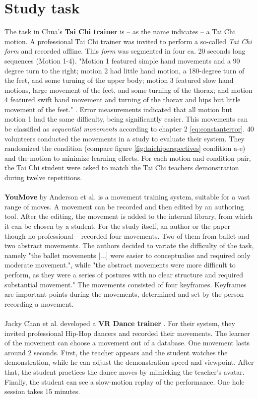 \section{Study task}
The task in Chua's \cite{Chua2003} \textbf{Tai Chi trainer} is \--- as the name indicates \--- a Tai Chi motion. A professional Tai Chi trainer was invited to perform a so-called \textit{Tai Chi form} and recorded offline. This \textit{form} was segmented in four ca. 20 seconds long sequences (Motion 1-4). "Motion 1 featured simple hand movements and a 90 degree turn to the right; motion 2 had little hand motion, a 180-degree turn of the feet, and some turning of the upper body; motion 3 featured slow hand motions, large movement of the feet, and some turning of the thorax; and motion 4 featured swift hand movement and turning of the thorax and hips but little movement of the feet." \cite{Chua2003}. Error measurements indicated that all motion but motion 1 had the same difficulty, being significantly easier. This movements can be classified as \textit{sequential movements} according to chapter 2 \ref{eq:constanterror}. 40 volunteers conducted the movements in a study to evaluate their system. They randomized the condition (compare figure \ref{fig:taichiperspectives} condition a-e) and the motion to minimize learning effects. For each motion and condition pair, the Tai Chi student were asked to match the Tai Chi teachers demonstration during twelve repetitions.\\ \\
\textbf{YouMove} by Anderson et al. \cite{Anderson2013a} is a movement training system, suitable for a vast range of moves. A movement can be recorded and then edited by an authoring tool. After the editing, the movement is added to the internal library, from which it can be chosen by a student. For the study itself, an author or the paper \--- though no professional \--- recorded four movements. Two of them from ballet and two abstract movements. The authors decided to variate the difficulty of the task, namely "the ballet movements [...] were easier to conceptualise and required only moderate movement.", while "the abstract movements were more difficult to perform, as they were a series of postures with no clear structure and required substantial movement." The movements consisted of four keyframes. Keyframes are important points during the movements, determined and set by the person recording a movement.\\ \\
Jacky Chan et al. developed a \textbf{VR Dance trainer} \cite{Chan2010}. For their system, they invited professional Hip-Hop dancers and recorded their movements. The learner of the movement can choose a movement out of a database. One movement lasts around 2 seconds. First, the teacher appears and the student watches the demonstration, while he can adjust the demonstration speed and viewpoint. After that, the student practices the dance moves by mimicking the teacher's avatar. Finally, the student can see a slow-motion replay of the performance. One hole session takes 15 minutes.\\ \\
